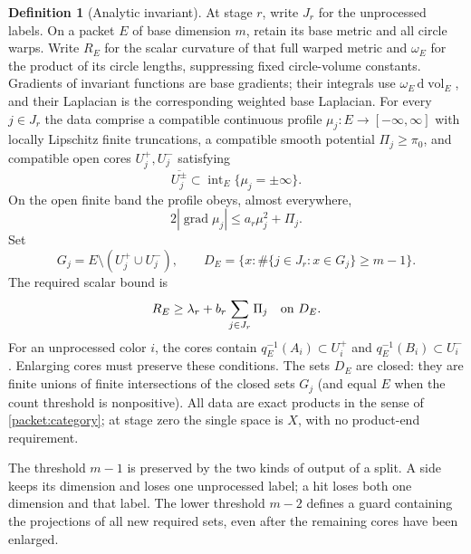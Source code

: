 \documentclass[11pt]{article}
\numberwithin{equation}{section}
\theoremstyle{definition}
\newtheorem{definition}[theorem]{Definition}
\theoremstyle{remark}
\begin{document}
\begin{definition}[Analytic invariant]\label{packet:invariant}
At stage $r$, write $J_r$ for the unprocessed labels.  On a packet $E$
of base dimension $m$, retain its base metric and all circle warps.
Write $R_E$ for the scalar curvature of that full warped metric and
$\omega_E$ for the product of its circle lengths, suppressing fixed
circle-volume constants.  Gradients of invariant functions are base
gradients; their integrals use $\omega_E\,\mathrm d\operatorname{vol}_E$, and their
Laplacian is the corresponding weighted base Laplacian.
For every $j\in J_r$ the data comprise a compatible continuous profile
$\mu_j:E\to[-\infty,\infty]$ with locally Lipschitz finite truncations,
a compatible smooth potential $\Pi_j\ge\pi_0$, and compatible open
cores $U_j^+,U_j^-$ satisfying
\begin{equation}\label{packet:core-poles}
 \overline{U_j^\pm}\subset
 \operatorname{int}_E\{\mu_j=\pm\infty\}.
\end{equation}
On the open finite band the profile obeys, almost everywhere,
\begin{equation}\label{packet:profile}
 2|\operatorname{grad}\mu_j|\le a_r\mu_j^2+\Pi_j.
\end{equation}
Set
\begin{equation}\label{packet:required-set}
 G_j=E\setminus(U_j^+\cup U_j^-),\qquad
 D_E=\bigl\{x:\#\{j\in J_r:x\in G_j\}\ge m-1\bigr\}.
\end{equation}
The required scalar bound is
\begin{equation}\label{packet:curvature}
 R_E\ge\lambda_r+b_r\sum_{j\in J_r}\Pi_j
       \quad\hbox{on }D_E.
\end{equation}
For an unprocessed color $i$, the cores contain
$q_E^{-1}(A_i)\subset U_i^+$ and
$q_E^{-1}(B_i)\subset U_i^-$.  Enlarging cores must preserve these
conditions.  The sets $D_E$ are closed: they are finite unions of finite intersections
of the closed sets $G_j$ (and equal $E$ when the count threshold is
nonpositive).  All data are exact products
in the sense of \cref{packet:category}; at stage zero the single
space is $X$, with no product-end requirement.
\end{definition}

The threshold $m-1$ is preserved by the two kinds of output of a
split. A side keeps its dimension and loses one unprocessed label;
a hit loses both one dimension and that label. The lower threshold
$m-2$ defines a guard containing the projections of all new required
sets, even after the remaining cores have been enlarged.
\end{document}
